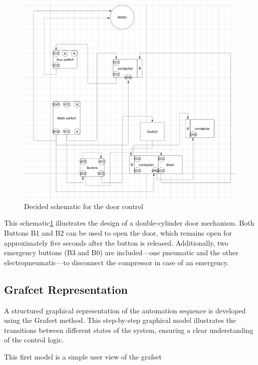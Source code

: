 \begin{figure}[H]
    \includegraphics[width=16cm]{Images/Q2/eletrical_circuit.png}
    \centering
    \caption{Decided schematic for the door control}
    \label{fig:eletrical_circuit}
\end{figure}


This schematic\ref{fig:eletrical_circuit} illustrates the design of a double-cylinder door mechanism. Both Buttons B1 and B2 
can be used to open the door, which remains open for approximately five seconds after the button is 
released. Additionally, two emergency buttons (B3 and B0) are included—one pneumatic and the other 
electropneumatic—to disconnect the compressor in case of an emergency.

\subsection{Grafcet Representation} \label{sec:Grafcet_Representation}

A structured graphical representation of the automation sequence is developed using the 
Grafcet method. This step-by-step graphical model illustrates the transitions between 
different states of the system, ensuring a clear understanding of the control logic.

This first model is a simple user view of the grafset

